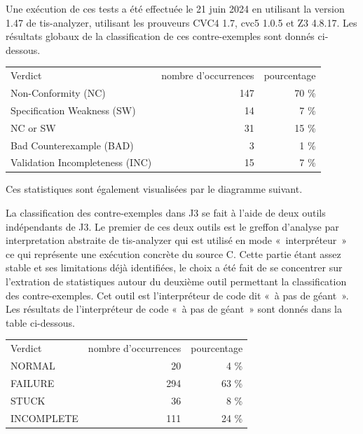 \documentclass[a4paper,11pt]{article}
\begin{document}
Une exécution de ces tests a été effectuée le 21 juin 2024 en utilisant la
version 1.47 de tis-analyzer, utilisant les prouveurs CVC4 1.7, cvc5 1.0.5 et
Z3 4.8.17. Les résultats globaux de la classification de ces contre-exemples
sont donnés ci-dessous.

\begin{center}
  \begin{tabular}{|l|r|r|}
    \hline
  \rowcolor{gray!50} Verdict
  & \multicolumn{1}{p{0.13\textwidth}|}{nombre d'occurrences}
  & \multicolumn{1}{p{0.13\textwidth}|}{pourcentage}
  \\
Non-Conformity (NC)                 & 147 & 70 \% \\
Specification Weakness (SW)         &  14 &  7 \% \\
NC or SW  	                        &  31 & 15 \% \\
Bad Counterexample (BAD)            &   3 &  1 \% \\
    Validation Incompleteness (INC) &  15 &  7 \% \\
    \hline
  \end{tabular}
\end{center}
Ces statistiques sont également visualisées par le diagramme
suivant.
  \begin{center}
\end{center}

La classification des contre-exemples dans J3 se fait à l'aide de deux outils
indépendants de J3. Le premier de ces deux outils est le greffon d'analyse par
interpretation abstraite de tis-analyzer qui est utilisé en mode «~interpréteur~»
ce qui représente une exécution concrète du source C. Cette partie étant assez
stable et ses limitations déjà identifiées, le choix a été fait de se concentrer
sur l'extration de statistiques autour du deuxième outil permettant la
classification des contre-exemples. Cet outil est l'interpréteur de code dit
«~à pas de géant~». Les résultats de l'interpréteur de code «~à pas de géant~»
sont donnés dans la table ci-dessous.

\begin{center}
  \begin{tabular}{|l|r|r|}
    \hline
  \rowcolor{gray!50} Verdict
  & \multicolumn{1}{p{0.13\textwidth}|}{nombre d'occurrences}
  & \multicolumn{1}{p{0.13\textwidth}|}{pourcentage}
  \\
    NORMAL                              &  20 &  4 \% \\
    FAILURE                             & 294 & 63 \% \\
    STUCK                               &  36 &  8 \% \\
    INCOMPLETE                          & 111 & 24 \% \\
    \hline
  \end{tabular}
\end{center}
\end{document}
